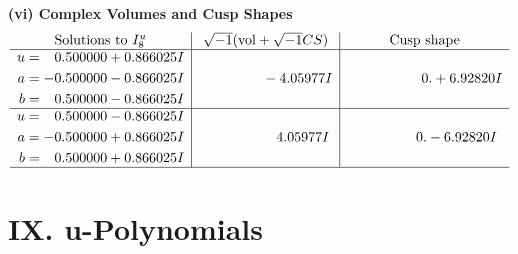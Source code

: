 \documentclass[1p]{elsarticle_modified}
\theoremstyle{definition}
\newcommand{\I}{\sqrt{-1}}
\begin{document}
\newpage\flushleft \textbf{(vi) Complex Volumes and Cusp Shapes}
$$\begin{array}{c|c|c}  
\text{Solutions to }I^u_{8}& \I (\text{vol} + \sqrt{-1}CS) & \text{Cusp shape}\\
 \hline 
\begin{aligned}
u &= \phantom{-}0.500000 + 0.866025 I \\
a &= -0.500000 - 0.866025 I \\
b &= \phantom{-}0.500000 - 0.866025 I\end{aligned}
 & \phantom{-0.000000 } -4.05977 I & \phantom{-0.000000 -}0. + 6.92820 I \\ \hline\begin{aligned}
u &= \phantom{-}0.500000 - 0.866025 I \\
a &= -0.500000 + 0.866025 I \\
b &= \phantom{-}0.500000 + 0.866025 I\end{aligned}
 & \phantom{-0.000000 -}4.05977 I & \phantom{-0.000000 } 0. - 6.92820 I\\
 \hline 
 \end{array}$$\newpage
\newpage\renewcommand{\arraystretch}{1}
\centering \section*{ IX. u-Polynomials}
\end{document}
